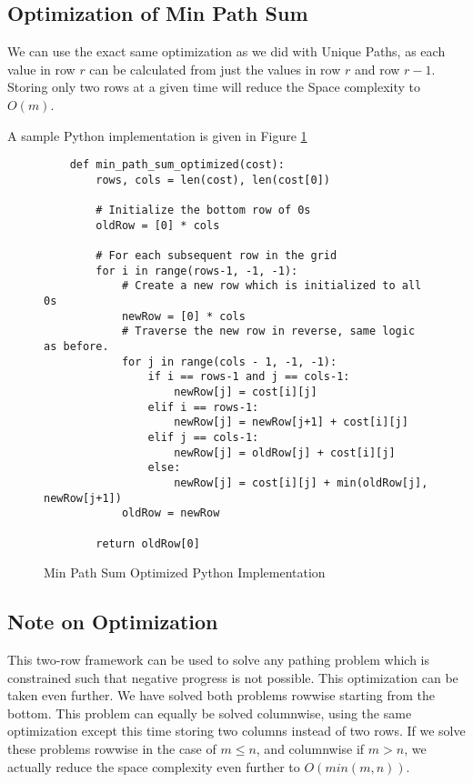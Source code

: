 \subsection{Optimization of Min Path Sum}
We can use the exact same optimization as we did with Unique Paths, as each value in row $r$ can be calculated from just the values in row $r$ and row $r-1$.
Storing only two rows at a given time will reduce the Space complexity to $O(m)$.

A sample Python implementation is given in Figure \ref{fig:min-path-sum-optimized}
\begin{figure}[H]
    \centering
    \begin{lstlisting}
    def min_path_sum_optimized(cost):
        rows, cols = len(cost), len(cost[0])
        
        # Initialize the bottom row of 0s
        oldRow = [0] * cols
    
        # For each subsequent row in the grid
        for i in range(rows-1, -1, -1):
            # Create a new row which is initialized to all 0s
            newRow = [0] * cols
            # Traverse the new row in reverse, same logic as before.
            for j in range(cols - 1, -1, -1):
                if i == rows-1 and j == cols-1:
                    newRow[j] = cost[i][j]
                elif i == rows-1:
                    newRow[j] = newRow[j+1] + cost[i][j]
                elif j == cols-1:
                    newRow[j] = oldRow[j] + cost[i][j]
                else:
                    newRow[j] = cost[i][j] + min(oldRow[j], newRow[j+1])
            oldRow = newRow
    
        return oldRow[0]
    \end{lstlisting}
    \caption{Min Path Sum Optimized Python Implementation}
    \label{fig:min-path-sum-optimized}
\end{figure}
\subsection{Note on Optimization}
This two-row framework can be used to solve any pathing problem which is constrained such that negative progress is not possible.
This optimization can be taken even further. We have solved both problems rowwise starting from the bottom. This problem can equally be solved columnwise,
using the same optimization except this time storing two columns instead of two rows.
If we solve these problems rowwise in the case of $m \leq n$, and columnwise if $m > n$, we actually reduce the space complexity even further to $O(min(m,n))$.